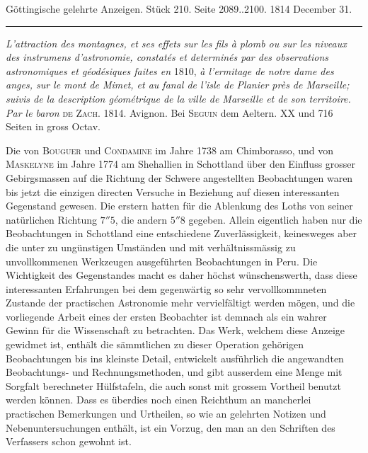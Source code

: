 \clearpage
{}
\hypertarget{native-574-lower}{}
\begin{center}\small Göttingische gelehrte Anzeigen. Stück 210. Seite 2089..2100. 1814 December 31.\\[3pt]\rule{.72\linewidth}{.3pt}\end{center}

\emph{L'attraction des montagnes, et ses effets sur les fils à plomb ou sur les niveaux des
instrumens d'astronomie, constatés et determinés par des observations astronomiques et
géodésiques faites en} 1810, \emph{à l'ermitage de notre dame des anges, sur le mont de Mimet, et
au fanal de l'isle de Planier près de Marseille; suivis de la description géométrique de la
ville de Marseille et de son territoire. Par le baron} \textsc{de Zach}. 1814.
Avignon. Bei \textsc{Seguin} dem Aeltern. XX und 716 Seiten in gross Octav.

Die von \textsc{Bouguer} und \textsc{Condamine} im Jahre 1738 am Chimborasso, und von
\textsc{Maskelyne} im Jahre 1774 am Shehallien
 in Schottland über den Einfluss grosser Gebirgsmassen auf die Richtung der Schwere
angestellten Beobachtungen waren bis jetzt die einzigen directen Versuche in Beziehung auf
diesen interessanten Gegenstand gewesen. Die erstern hatten für die Ablenkung des Loths von
seiner natürlichen Richtung $7''5$, die andern $5''8$ gegeben. Allein eigentlich haben nur
die Beobachtungen in Schottland eine entschiedene Zuverlässigkeit, keinesweges aber die
unter zu ungünstigen Umständen und mit verhältnissmässig zu unvollkommenen Werkzeugen
ausgeführten Beobachtungen in Peru. Die Wichtigkeit des Gegenstandes macht es daher höchst
wünschenswerth, dass diese interessanten Erfahrungen bei dem gegenwärtig so sehr
vervollkommneten Zustande der practischen Astronomie mehr vervielfältigt werden mögen, und
die vorliegende Arbeit eines der ersten Beobachter ist demnach als ein wahrer Gewinn für die
Wissenschaft zu betrachten. Das Werk, welchem diese Anzeige gewidmet ist, enthält die
sämmtlichen zu dieser Operation gehörigen Beobachtungen bis ins kleinste Detail, entwickelt
ausführlich die angewandten Beobachtungs- und Rechnungsmethoden, und gibt ausserdem eine
Menge mit Sorgfalt berechneter Hülfstafeln, die auch sonst mit grossem Vortheil benutzt
werden können. Dass es überdies noch einen Reichthum an mancherlei practischen Bemerkungen
und Urtheilen, so wie an gelehrten Notizen und Nebenuntersuchungen enthält, ist ein
Vorzug, den man an den Schriften des Verfassers schon gewohnt ist.

